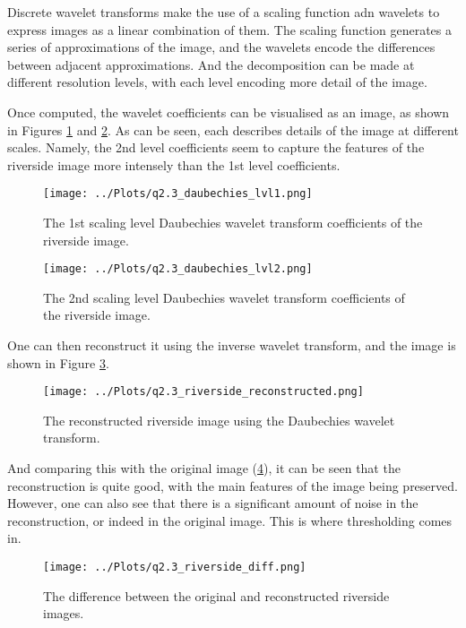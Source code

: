 \documentclass[12pt]{report} %
\begin{document}
Discrete wavelet transforms make the use of a scaling function adn wavelets to express images as a linear combination of them. The scaling function generates a series of approximations of the image, and the wavelets encode the differences between adjacent approximations. And the decomposition can be made at different resolution levels, with each level encoding more detail of the image\cite{mallat1989theory}.

Once computed, the wavelet coefficients can be visualised as an image, as shown in Figures \ref{fig:wavelet_coefficients} and \ref{fig:wavelet_coefficients2}. As can be seen, each describes details of the image at different scales. Namely, the 2nd level coefficients seem to capture the features of the riverside image more intensely than the 1st level coefficients.

\begin{figure}[htbp]
    \centering
    \texttt{[image: ../Plots/q2.3\_daubechies\_lvl1.png]}
    \caption{The 1st scaling level Daubechies wavelet transform coefficients of the riverside image.}
    \label{fig:wavelet_coefficients}
\end{figure}

\begin{figure}[htbp]
    \centering
    \texttt{[image: ../Plots/q2.3\_daubechies\_lvl2.png]}
    \caption{The 2nd scaling level Daubechies wavelet transform coefficients of the riverside image.}
    \label{fig:wavelet_coefficients2}
\end{figure}

One can then reconstruct it using the inverse wavelet transform, and the image is shown in Figure \ref{fig:reconstructed_image}.

\begin{figure}[htbp]
    \centering
    \texttt{[image: ../Plots/q2.3\_riverside\_reconstructed.png]}
    \caption{The reconstructed riverside image using the Daubechies wavelet transform.}
    \label{fig:reconstructed_image}
\end{figure}

And comparing this with the original image (\ref{fig:diff_image}), it can be seen that the reconstruction is quite good, with the main features of the image being preserved. However, one can also see that there is a significant amount of noise in the reconstruction, or indeed in the original image. This is where thresholding comes in.

\begin{figure}[htbp]
    \centering
    \texttt{[image: ../Plots/q2.3\_riverside\_diff.png]}
    \caption{The difference between the original and reconstructed riverside images.}
    \label{fig:diff_image}
\end{figure}
\end{document}
